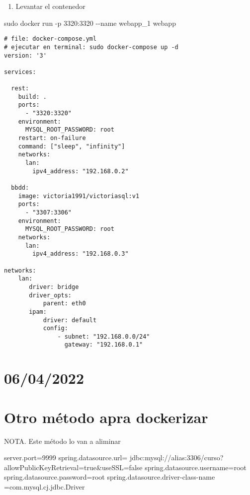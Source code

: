 \documentclass[
]{article}
\newenvironment{Shaded}{\begin{snugshade}}{\end{snugshade}}
\newcommand{\AttributeTok}[1]{\textcolor[rgb]{0.49,0.56,0.16}{#1}}
\newcommand{\FunctionTok}[1]{\textcolor[rgb]{0.02,0.16,0.49}{#1}}
\newcommand{\NormalTok}[1]{#1}
\providecommand{\tightlist}{%
  \setlength{\itemsep}{0pt}\setlength{\parskip}{0pt}}
\begin{document}
\begin{enumerate}
\def\labelenumi{\arabic{enumi}.}
\setcounter{enumi}{4}
\tightlist
\item
  Levantar el contenedor
\end{enumerate}

\begin{Shaded}
\begin{Highlighting}[]
\FunctionTok{sudo}\NormalTok{ docker run }\AttributeTok{{-}p}\NormalTok{ 3320:3320 }\AttributeTok{{-}{-}name}\NormalTok{ webapp\_1 webapp}
\end{Highlighting}
\end{Shaded}

\begin{verbatim}
# file: docker-compose.yml
# ejecutar en terminal: sudo docker-compose up -d
version: '3'

services:

  rest:
    build: .
    ports:
      - "3320:3320"
    environment:
      MYSQL_ROOT_PASSWORD: root
    restart: on-failure
    command: ["sleep", "infinity"]
    networks:
      lan:
        ipv4_address: "192.168.0.2"

  bbdd:
    image: victoria1991/victoriasql:v1
    ports:
      - "3307:3306"
    environment:
      MYSQL_ROOT_PASSWORD: root
    networks:
      lan:
        ipv4_address: "192.168.0.3"
        
networks:
    lan:
       driver: bridge
       driver_opts:
           parent: eth0
       ipam:
           driver: default
           config:
               - subnet: "192.168.0.0/24"
                 gateway: "192.168.0.1"
\end{verbatim}

\hypertarget{section-3}{%
\section{06/04/2022}\label{section-3}}

\hypertarget{otro-muxe9todo-apra-dockerizar}{%
\section{Otro método apra
dockerizar}\label{otro-muxe9todo-apra-dockerizar}}

NOTA. Este método lo van a aliminar

\begin{Shaded}
\begin{Highlighting}[]
\NormalTok{server.port=9999}
\NormalTok{spring.datasource.url= jdbc:mysql://alias:3306/curso?allowPublicKeyRetrieval=true\&useSSL=false}
\NormalTok{spring.datasource.username=root}
\NormalTok{spring.datasource.password=root}
\NormalTok{spring.datasource.driver{-}class{-}name =com.mysql.cj.jdbc.Driver}
\end{Highlighting}
\end{Shaded}
\end{document}
